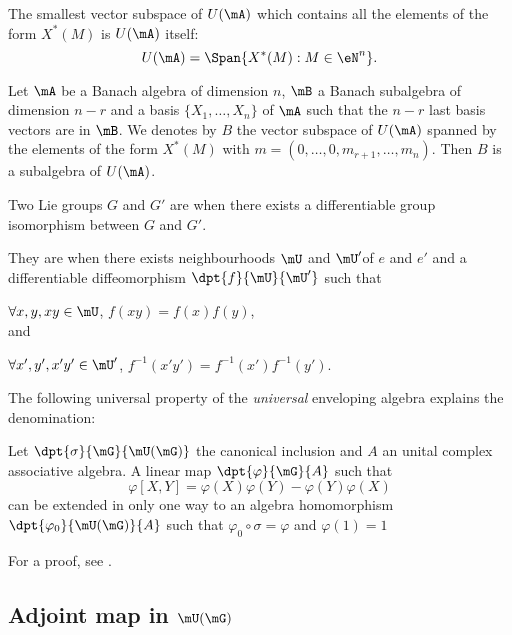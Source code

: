 \begin{proposition}
	The smallest vector subspace of $U(\mA)$ which contains all the elements of the form $X^*(M)$ is $U(\mA)$ itself:
	\[
		U(\mA)=\Span\{ X^*(M):M\in \eN^n \}.
	\]
\end{proposition}

\begin{corollary} \label{cor:/24}
	Let $\mA$ be a Banach algebra of dimension $n$, $\mB$ a Banach subalgebra of dimension $n-r$ and a basis $\{X_1,\ldots,X_n\}$ of $\mA$ such that the $n-r$ last basis vectors are in $\mB$. We denotes by $B$ the vector subspace of $U(\mA)$ spanned by the elements of the form $X^*(M)$ with $m=(0,\ldots,0,m_{r+1},\ldots,m_n)$. Then $B$ is a subalgebra of $U(\mA)$.
\end{corollary}

\begin{definition}
	Two Lie groups $G$ and $G'$ are  when there exists a differentiable group isomorphism between $G$ and $G'$.

	They are  when there exists neighbourhoods $\mU$ and $\mU'$of $e$ and $e'$ and a differentiable diffeomorphism $\dpt{f}{\mU}{\mU'}$ such that

	$\forall x,y,xy\in\mU$, $f(xy)=f(x)f(y)$, \\and

	$\forall x',y',x'y'\in\mU'$, $f^{-1}(x'y')=f^{-1}(x')f^{-1}(y')$.
\end{definition}

The following universal property of the \emph{universal} enveloping algebra explains the denomination:
\begin{proposition}
	Let $\dpt{\sigma}{\mG}{\mU(\mG)}$ the canonical inclusion and $A$ an unital complex associative algebra. A linear map $\dpt{\varphi}{\mG}{A}$ such that
	\begin{equation}
		\varphi[X,Y]=\varphi(X)\varphi(Y)-\varphi(Y)\varphi(X)
	\end{equation}
	can be extended in only one way to an algebra homomorphism $\dpt{\varphi_0}{\mU(\mG)}{A}$ such that $\varphi_0\circ\sigma=\varphi$ and $\varphi(1)=1$
	\label{prop:extunifmap}
\end{proposition}
For a proof, see \cite{Knapp_reprez}.

\subsection{Adjoint map in \texorpdfstring{$\mU(\mG)$}{U(G)}}   \label{ssadjunif}

